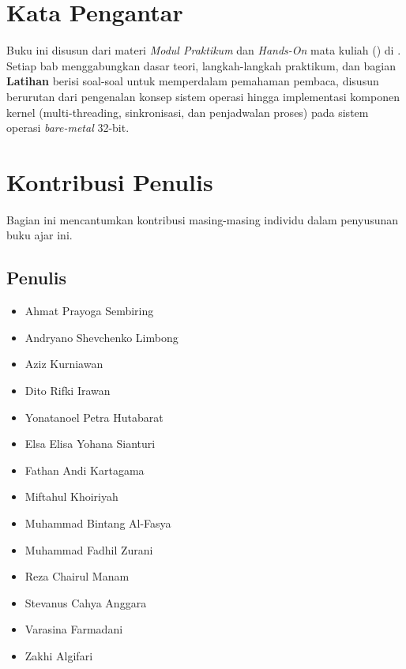 \documentclass[10pt,a5paper,openany]{report}
\begin{document}


\thispagestyle{empty}
\section*{Kata Pengantar}
Buku ini disusun dari materi \textit{Modul Praktikum} dan \textit{Hands-On} mata kuliah \courseName{} (\courseCode{}) di \institution{}. Setiap bab menggabungkan dasar teori, langkah-langkah praktikum, dan bagian \textbf{Latihan} berisi soal-soal untuk memperdalam pemahaman pembaca, disusun berurutan dari pengenalan konsep sistem operasi hingga implementasi komponen kernel (multi-threading, sinkronisasi, dan penjadwalan proses) pada sistem operasi \textit{bare-metal} 32-bit.
\newpage

\tableofcontents
\newpage














\cleardoublepage
\section*{Kontribusi Penulis}

Bagian ini mencantumkan kontribusi masing-masing individu dalam penyusunan buku ajar ini.

\subsection*{Penulis}
\begin{itemize}[label=]
	\item Ahmat Prayoga Sembiring
	\item Andryano Shevchenko Limbong
	\item Aziz Kurniawan
	\item Dito Rifki Irawan
	\item Yonatanoel Petra Hutabarat
	\item Elsa Elisa Yohana Sianturi
	\item Fathan Andi Kartagama
	\item Miftahul Khoiriyah
	\item Muhammad Bintang Al-Fasya
	\item Muhammad Fadhil Zurani
	\item Reza Chairul Manam
	\item Stevanus Cahya Anggara
	\item Varasina Farmadani
	\item Zakhi Algifari
\end{itemize}
\end{document}
